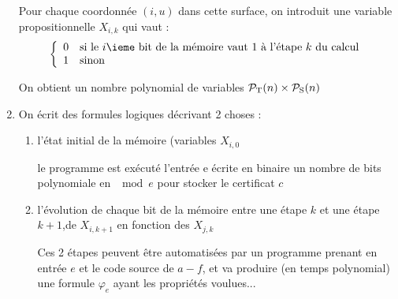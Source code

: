 \documentclass[a4paper,french,bookmarks]{book}
\begin{document}
\begin{nproof}
\begin{enumerate}
\begin{center}
            \end{center}
        
            Pour chaque coordonnée $(i, u)$ dans cette surface, on introduit une variable propositionnelle $X_{i, k}$ qui vaut :
            \[ \left\lbrace\begin{array}{cl}
                0 &\text{si le $i$\ieme~bit de la mémoire vaut $1$ à l'étape $k$ du calcul}  \\
                1 &\text{sinon}
            \end{array}\right.\]
        
            On obtient un nombre polynomial de variables $\mathcal{P}_\text T\!\left(n\right) \times \mathcal{P}_\text S\!\left(n\right)$
            
            \item On écrit des formules logiques décrivant 2 choses :
            
            \begin{enumerate}
                \item l'état initial de la mémoire (variables $X_{i, 0}$
                \begin{enumerate}
                    \itt le programme est exécuté
                    \itt l'entrée e écrite en binaire
                    \itt un nombre de bits polynomiale en $\mod e$ pour stocker le certificat $c$
                \end{enumerate}
                
                \item l'évolution de chaque bit de la mémoire entre une étape $k$ et une étape $k + 1$,\ie de $X_{i, k+1}$ en fonction des $X_{j, k}$
                
                Ces 2 étapes peuvent être automatisées par un programme prenant en entrée $e$ et le code source de $a-f$, et va produire (en temps polynomial) une formule $\varphi_e$ ayant les propriétés voulues...
            \end{enumerate}
        \end{enumerate}
    \end{nproof}
    
\end{document}
